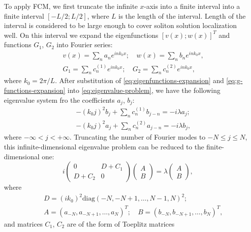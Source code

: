 To apply FCM, we first truncate the infinite $x$-axis into a finite interval into  a finite interval $[-L/2; L/2]$, where $L$ is the length of the interval.
Length of the interval is considered to be large enough to cover soliton solution localization well.
On this interval we expand the eigenfunctions $[v(x); w(x)]^T$ and functions $G_1$, $G_2$ into Fourier series:
\begin{eqnarray}
	&& 	v(x) = \sum \limits_n a_n e^{i n k_0 x}; \quad w(x) = \sum \limits_n b_n e^{i n k_0 x}, \label{eq:eigenfunctions-expansion} \\
	&& G_1 = \sum \limits_n c_n^{(1)} e^{i n k_0 x}; \quad G_2 = \sum \limits_n c_n^{(2)} e^{i n k_0 x} \label{eq:g-functions-expansion},
\end{eqnarray}
where $k_0 = 2 \pi / L$.
After substitution of \eqref{eq:eigenfunctions-expansion} and \eqref{eq:g-functions-expansion} into \eqref{eq:eigenvalue-problem}, we have the following eigenvalue system fro the coefficients $a_j$, $b_j$:
\begin{eqnarray}
	&& -(k_0 j)^2 b_j + \sum \limits_n 	c_n^{(1)} b_{j - n} = -i \lambda a_j; \\
	&& -(k_0 j)^2 a_j + \sum \limits_n 	c_n^{(2)} a_{j - n} = -i \lambda b_j,
\end{eqnarray}
where $-\infty < j < +\infty$.
Truncating the number of Fourier modes to $-N \le j \le N$, this infinite-dimensional eigenvalue problem can be reduced to the finite-dimensional one:
\begin{equation}
	i
	\begin{pmatrix}
		0 & D + C_1 \\ D + C_2 & 0
	\end{pmatrix}
	\begin{pmatrix}
		A \\ B
	\end{pmatrix}
	= \lambda
	\begin{pmatrix}
		A \\ B
	\end{pmatrix},
\label{eq:eigenvalue-problem-matrix}
\end{equation}
where
\begin{eqnarray*}
	&& D = (ik_0)^2 \mathrm{diag}(-N, -N+1, \dots, N-1, N)^2; \\
	&& A = (a_{-N}, a_{-N+1}, \dots, a_N)^T; \quad B = (b_{-N}, b_{-N+1}, \dots, b_N)^T,
\end{eqnarray*}
and matrices $C_1$, $C_2$ are of the form of Toeplitz matrices
